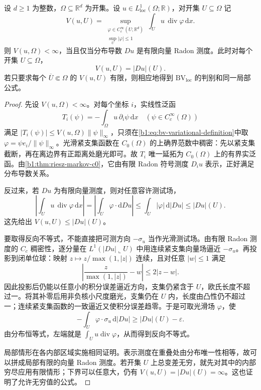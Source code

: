 \begin{proposition}\label{b1:prop:bv-variation-duality}
设 \(d\ge1\) 为整数，\(\Omega\subseteq\mathbb R^d\) 为开集。设 \(u\in L^1_{\mathrm{loc}}(\Omega;\mathbb R)\)，对开集 \(U\subseteq\Omega\) 记
\[
 V(u,U)=\sup_{\substack{\varphi\in C_c^\infty(U;\mathbb R^d)\\\sup_U|\varphi|\le1}}
             \int_Uu\,\operatorname{div}\varphi\,\mathrm dx.
\]则 \(V(u,\Omega)<\infty\)，当且仅当分布导数 \(Du\) 是有限向量 Radon 测度。此时对每个开集 \(U\subseteq\Omega\)，
\begin{equation}\label{b1:eq:bv-variation-open-set}
 V(u,U)=|Du|(U).
\end{equation}
若只要求每个 \(\overline U\Subset\Omega\) 的 \(V(u,U)\) 有限，则相应地得到 \(\mathrm{BV}_{\mathrm{loc}}\) 的判别和同一局部公式。
\end{proposition}
\begin{proof}
先设 \(V(u,\Omega)<\infty\)。对每个坐标 \(i\)，实线性泛函
\[
 T_i(\psi)=-\int_\Omega u\,\partial_i\psi\,\mathrm dx
 \quad(\psi\in C_c^\infty(\Omega))
\]
满足 \(|T_i(\psi)|\le V(u,\Omega)\|\psi\|_\infty\)，只须在\eqref{b1:eq:bv-variational-definition}中取 \(\varphi=\psi e_i/\|\psi\|_\infty\)。光滑紧支集函数在 \(C_0(\Omega)\) 的上确界范数中稠密：先以紧支集截断，再在离边界有正距离处磨光即可。故 \(T_i\) 唯一延拓为 \(C_0(\Omega)\) 上的有界实泛函。由\cref{b1:thm:riesz-markov-c0}，它由有限 Radon 符号测度 \(D_i u\) 表示，正好满足分布导数关系。

反过来，若 \(Du\) 为有限向量测度，则对任意容许测试场，
\[
 \left|\int_Uu\,\operatorname{div}\varphi\,\mathrm dx\right|
 =\left|\int_U\varphi\cdot\mathrm dDu\right|
 \le\int_U|\varphi|\,\mathrm d|Du|\le|Du|(U).
\]
这先给出 \(V(u,U)\le|Du|(U)\)。

要取得反向不等式，不能直接把可测方向 \(-\sigma_u\) 当作光滑测试场。由有限 Radon 测度的 \(C_c\) 稠密性，逐分量在 \(L^1(|Du|\!\llcorner U)\) 中用连续紧支集向量场逼近 \(-\sigma_u\)。再投影到闭单位球：映射 \(z\mapsto z/\max(1,|z|)\) 连续，且对任意 \(|w|\le1\) 满足
\[
 \left|\frac z{\max(1,|z|)}-w\right|\le2|z-w|.
\]
因此投影后仍能以任意小的积分误差逼近方向，支集仍紧含于 \(U\)，欧氏长度不超过一。将其补零后用非负核小尺度磨光，支集仍在 \(U\) 内，长度由凸性仍不超过一；连续紧支集函数的一致逼近又使积分误差趋零。于是可取光滑场 \(\varphi\)，使
\[
 -\int_U\varphi\cdot\sigma_u\,\mathrm d|Du|
 \ge |Du|(U)-\varepsilon.
\]
由分布恒等式，左端就是 \(\int_Uu\operatorname{div}\varphi\)，从而得到反向不等式。

局部情形在各内部区域实施相同证明。表示测度在重叠处由分布唯一性相等，故可以拼成局部有限的向量 Radon 测度。若开集 \(U\) 上总变差无穷，就先对其中的内部穷尽应用有限情形；下界可以任意大，仍有 \(V(u,U)=|Du|(U)=\infty\)。这也证明了允许无穷值的公式。
\end{proof}

